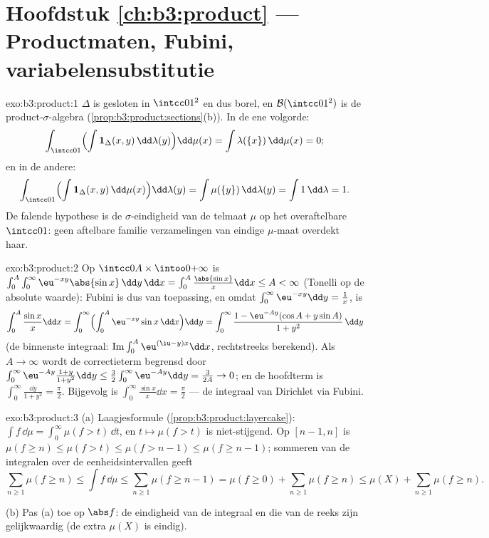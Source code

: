 \section*{Hoofdstuk \ref{ch:b3:product} --- Productmaten, Fubini,
variabelensubstitutie}

\begin{solution}{exo:b3:product:1}
$\Delta$ is gesloten in $\intcc01^2$ en dus borel, en $\mathcal
B(\intcc01^2)$ is de product-$\sigma$-algebra
(\cref{prop:b3:product:sections}(b)). In de ene volgorde:
\[
\int_{\intcc01}\Bigl(\int \mathbf 1_\Delta(x,y)
\,\dd\lambda(y)\Bigr)\dd\mu(x)
= \int \lambda(\{x\})\,\dd\mu(x) = 0 ;
\]
en in de andere:
\[
\int_{\intcc01}\Bigl(\int\mathbf
1_\Delta(x,y)\,\dd\mu(x)\Bigr)\dd\lambda(y)
= \int \mu(\{y\})\,\dd\lambda(y) = \int 1\,\dd\lambda = 1 .
\]
De falende hypothese is de $\sigma$-eindigheid van de telmaat
$\mu$ op het overaftelbare $\intcc01$: geen aftelbare familie
verzamelingen van eindige $\mu$-maat overdekt haar.
\end{solution}

\begin{solution}{exo:b3:product:2}
Op $\intcc0A\times\intoo0{+\infty}$ is
$\int_0^A\int_0^\infty\eu^{-xy}\abs{\sin x}\,\dd y\,\dd x =
\int_0^A\frac{\abs{\sin x}}x\dd x \leq A < \infty$ (Tonelli op de
absolute waarde): Fubini is dus van toepassing, en omdat
$\int_0^\infty\eu^{-xy}\dd y = \frac1x$, is
\[
\int_0^A\frac{\sin x}x\dd x
= \int_0^\infty\Bigl(\int_0^A\eu^{-xy}\sin x\,\dd
x\Bigr)\dd y
= \int_0^\infty \frac{1 - \eu^{-Ay}(\cos A + y\sin A)}{1 +
y^2}\,\dd y
\]
(de binnenste integraal: $\operatorname{Im}\int_0^A\eu^{(\iu -
y)x}\dd x$, rechtstreeks berekend). Als $A \to \infty$ wordt de
correctieterm begrensd door $\int_0^\infty\eu^{-Ay}\frac{1 + y}{1
+ y^2}\dd y \leq \frac32\int_0^\infty\eu^{-Ay}\dd y = \frac3{2A}
\to 0$; en de hoofdterm is $\int_0^\infty\frac{\dd y}{1+y^2} =
\frac\pi2$. Bijgevolg is $\int_0^\infty\frac{\sin x}x\dd x =
\frac\pi2$ --- de integraal van Dirichlet via Fubini.
\end{solution}

\begin{solution}{exo:b3:product:3}
(a) Laagjesformule (\cref{prop:b3:product:layercake}): $\int
f\,\dd\mu = \int_0^\infty\mu(f > t)\,\dd t$, en $t \mapsto \mu(f
> t)$ is niet-stijgend. Op $[n-1, n]$ is $\mu(f \geq n) \leq
\mu(f > t) \leq \mu(f > n - 1) \leq \mu(f \geq n - 1)$; sommeren
van de integralen over de eenheidsintervallen geeft
\[
\sum_{n\geq1}\mu(f \geq n) \leq \int f\,\dd\mu \leq
\sum_{n\geq1}\mu(f \geq n - 1) = \mu(f \geq 0) +
\sum_{n\geq1}\mu(f\geq n) \leq \mu(X) + \sum_{n\geq1}\mu(f\geq
n).
\]

(b) Pas (a) toe op $\abs f$: de eindigheid van de integraal en die
van de reeks zijn gelijkwaardig (de extra $\mu(X)$ is eindig).
\end{solution}

